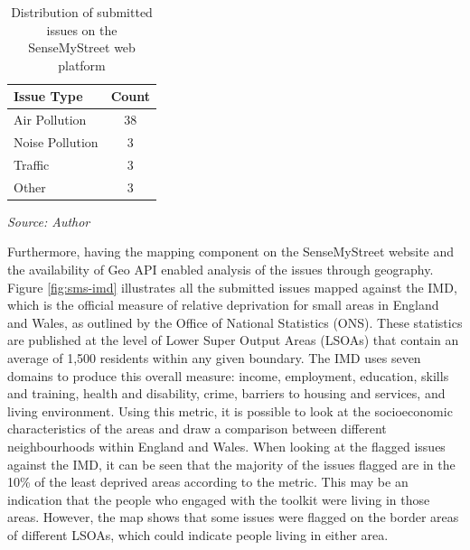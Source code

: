 \begin{table}[!th]
\small
\centering
\begin{tabular}{|l|c|}
  \hline
	\textbf{Issue Type} & \textbf{Count} \\ [0.5ex]
  \hline
   Air Pollution &  38 \\
   \hline
   Noise Pollution &  3 \\
   \hline
   Traffic &  3 \\
   \hline
   Other &  3 \\ [0.5ex]
  \hline
\end{tabular}

\smallskip\centering
    \footnotesize\emph{Source: Author}
\caption[Submitted Issues]{Distribution of submitted issues on the SenseMyStreet web platform}    
\label{table:flagged-issues}
\end{table}

Furthermore, having the mapping component on the SenseMyStreet website and the availability of Geo API enabled analysis of the issues through geography. Figure \ref{fig:sms-imd} illustrates all the submitted issues mapped against the IMD, which is the official measure of relative deprivation for small areas in England and Wales, as outlined by the Office of National Statistics (ONS). These statistics are published at the level of Lower Super Output Areas (LSOAs) that contain an average of 1,500 residents within any given boundary. The IMD uses seven domains to produce this overall measure: income, employment, education, skills and training, health and disability, crime, barriers to housing and services, and living environment. Using this metric, it is possible to look at the socioeconomic characteristics of the areas and draw a comparison between different neighbourhoods within England and Wales. When looking at the flagged issues against the IMD, it can be seen that the majority of the issues flagged are in the \colorbox{yellow!20}{10\% of the least deprived} areas according to the metric. This may be an indication that the people who engaged with the toolkit were living in those areas. However, the map shows that some issues were flagged on the border areas of different LSOAs, which could indicate people living in either area.

